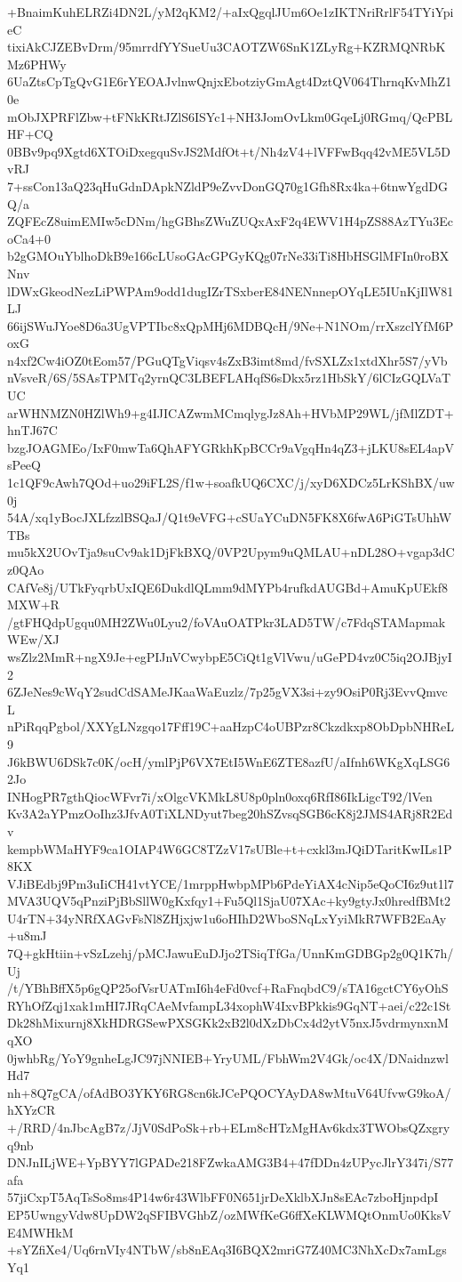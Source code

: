 +BnaimKuhELRZi4DN2L/yM2qKM2/+aIxQgqlJUm6Oe1zIKTNriRrlF54TYiYpieC
tixiAkCJZEBvDrm/95mrrdfYYSueUu3CAOTZW6SnK1ZLyRg+KZRMQNRbKMz6PHWy
6UaZtsCpTgQvG1E6rYEOAJvlnwQnjxEbotziyGmAgt4DztQV064ThrnqKvMhZ10e
mObJXPRFlZbw+tFNkKRtJZlS6ISYc1+NH3JomOvLkm0GqeLj0RGmq/QcPBLHF+CQ
0BBv9pq9Xgtd6XTOiDxegquSvJS2MdfOt+t/Nh4zV4+lVFFwBqq42vME5VL5DvRJ
7+ssCon13aQ23qHuGdnDApkNZldP9eZvvDonGQ70g1Gfh8Rx4ka+6tnwYgdDGQ/a
ZQFEcZ8uimEMIw5cDNm/hgGBhsZWuZUQxAxF2q4EWV1H4pZS88AzTYu3EcoCa4+0
b2gGMOuYblhoDkB9e166cLUsoGAcGPGyKQg07rNe33iTi8HbHSGlMFIn0roBXNnv
lDWxGkeodNezLiPWPAm9odd1dugIZrTSxberE84NENnnepOYqLE5IUnKjIlW81LJ
66ijSWuJYoe8D6a3UgVPTIbc8xQpMHj6MDBQcH/9Ne+N1NOm/rrXszclYfM6PoxG
n4xf2Cw4iOZ0tEom57/PGuQTgViqsv4sZxB3imt8md/fvSXLZx1xtdXhr5S7/yVb
nVsveR/6S/5SAsTPMTq2yrnQC3LBEFLAHqfS6sDkx5rz1HbSkY/6lCIzGQLVaTUC
arWHNMZN0HZlWh9+g4IJICAZwmMCmqlygJz8Ah+HVbMP29WL/jfMlZDT+hnTJ67C
bzgJOAGMEo/IxF0mwTa6QhAFYGRkhKpBCCr9aVgqHn4qZ3+jLKU8sEL4apVsPeeQ
1c1QF9cAwh7QOd+uo29iFL2S/f1w+soafkUQ6CXC/j/xyD6XDCz5LrKShBX/uw0j
54A/xq1yBocJXLfzzlBSQaJ/Q1t9eVFG+cSUaYCuDN5FK8X6fwA6PiGTsUhhWTBs
mu5kX2UOvTja9suCv9ak1DjFkBXQ/0VP2Upym9uQMLAU+nDL28O+vgap3dCz0QAo
CAfVe8j/UTkFyqrbUxIQE6DukdlQLmm9dMYPb4rufkdAUGBd+AmuKpUEkf8MXW+R
/gtFHQdpUgqu0MH2ZWu0Lyu2/foVAuOATPkr3LAD5TW/c7FdqSTAMapmakWEw/XJ
wsZlz2MmR+ngX9Je+egPIJnVCwybpE5CiQt1gVlVwu/uGePD4vz0C5iq2OJBjyI2
6ZJeNes9cWqY2sudCdSAMeJKaaWaEuzlz/7p25gVX3si+zy9OsiP0Rj3EvvQmvcL
nPiRqqPgbol/XXYgLNzgqo17Fff19C+aaHzpC4oUBPzr8Ckzdkxp8ObDpbNHReL9
J6kBWU6DSk7c0K/ocH/ymlPjP6VX7EtI5WnE6ZTE8azfU/aIfnh6WKgXqLSG62Jo
INHogPR7gthQiocWFvr7i/xOlgcVKMkL8U8p0pln0oxq6RfI86IkLigcT92/lVen
Kv3A2aYPmzOoIhz3JfvA0TiXLNDyut7beg20hSZvsqSGB6cK8j2JMS4ARj8R2Edv
kempbWMaHYF9ca1OIAP4W6GC8TZzV17sUBle+t+cxkl3mJQiDTaritKwILs1P8KX
VJiBEdbj9Pm3uIiCH41vtYCE/1mrppHwbpMPb6PdeYiAX4cNip5eQoCI6z9ut1l7
MVA3UQV5qPnziPjBbSllW0gKxfqy1+Fu5Ql1SjaU07XAc+ky9gtyJx0hredfBMt2
U4rTN+34yNRfXAGvFsNl8ZHjxjw1u6oHIhD2WboSNqLxYyiMkR7WFB2EaAy+u8mJ
7Q+gkHtiin+vSzLzehj/pMCJawuEuDJjo2TSiqTfGa/UnnKmGDBGp2g0Q1K7h/Uj
/t/YBhBffX5p6gQP25ofVsrUATmI6h4eFd0vcf+RaFnqbdC9/sTA16gctCY6yOhS
RYhOfZqj1xak1mHI7JRqCAeMvfampL34xophW4IxvBPkkis9GqNT+aei/c22c1St
Dk28hMixurnj8XkHDRGSewPXSGKk2xB2l0dXzDbCx4d2ytV5nxJ5vdrmynxnMqXO
0jwhbRg/YoY9gnheLgJC97jNNIEB+YryUML/FbhWm2V4Gk/oc4X/DNaidnzwlHd7
nh+8Q7gCA/ofAdBO3YKY6RG8cn6kJCePQOCYAyDA8wMtuV64UfvwG9koA/hXYzCR
+/RRD/4nJbcAgB7z/JjV0SdPoSk+rb+ELm8cHTzMgHAv6kdx3TWObsQZxgryq9nb
DNJnILjWE+YpBYY7lGPADe218FZwkaAMG3B4+47fDDn4zUPycJlrY347i/S77afa
57jiCxpT5AqTsSo8ms4P14w6r43WlbFF0N651jrDeXklbXJn8sEAc7zboHjnpdpI
EP5UwngyVdw8UpDW2qSFIBVGhbZ/ozMWfKeG6ffXeKLWMQtOnmUo0KksVE4MWHkM
+sYZfiXe4/Uq6rnVIy4NTbW/sb8nEAq3I6BQX2mriG7Z40MC3NhXcDx7amLgsYq1
